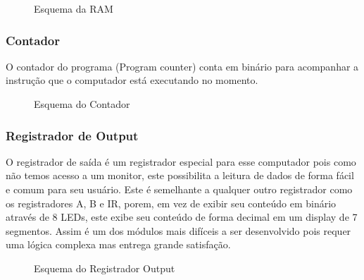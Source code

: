 \vspace{1cm}
\begin{figure}[H] \centering 
  \caption{\label{schematics_ram} Esquema da RAM} 
\end{figure}

\subsubsection{Contador}
O contador do programa (Program counter) conta em binário para acompanhar a instrução que o computador está executando no momento.

\vspace{1cm}
\begin{figure}[H] \centering 
  \caption{\label{schematics_pc} Esquema do Contador} 
\end{figure}

\subsubsection{Registrador de Output}
O registrador de saída é um registrador especial para esse computador pois como não temos acesso a um monitor, este possibilita a leitura de dados de forma fácil e comum para seu usuário.  Este é semelhante a qualquer outro registrador como os registradores A, B e IR, porem, em vez de exibir seu conteúdo em binário através de 8 LEDs, este exibe seu conteúdo de forma decimal em um display de 7 segmentos. Assim é um dos módulos mais difíceis a ser desenvolvido pois requer uma lógica complexa mas entrega grande satisfação.

\vspace{1cm}
\begin{figure}[H] \centering 
  \caption{\label{schematics_output} Esquema do Registrador Output} 
\end{figure}


